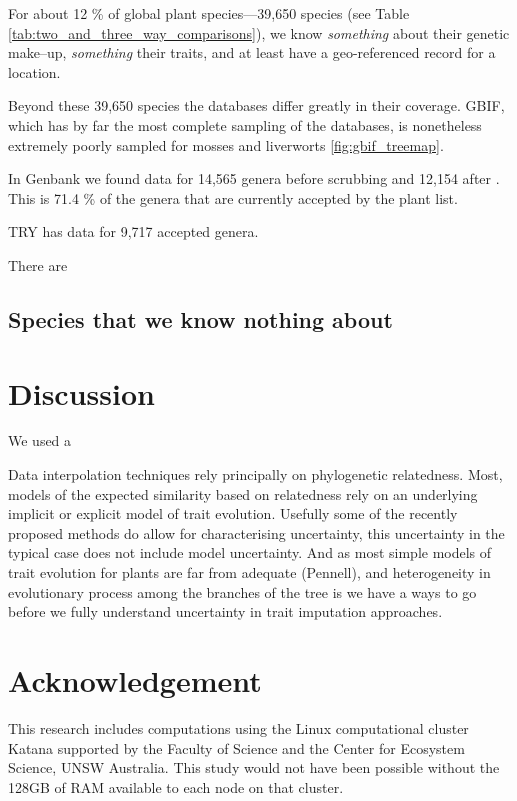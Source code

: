 \documentclass[a4paper,11pt]{article}
\begin{document}
For about 12 \% of global plant species---39,650 species (see Table \ref{tab:two_and_three_way_comparisons}), we know \emph{something} about their genetic make--up, \emph{something} their traits, and at least have a geo-referenced record for a location.  

Beyond these 39,650 species the databases differ greatly in their coverage.  GBIF, which has by far the most complete sampling of the databases, is nonetheless extremely poorly sampled for mosses and liverworts \ref{fig:gbif_treemap}.  

In Genbank we found data for 14,565 genera before scrubbing and 12,154 after \citep[see][for a detailed analysis of number of genes and phylogenetic distribution of the data]{hinchliff2014some}.  This is 71.4 \% of the genera that are currently accepted by the plant list.  

TRY has data for 9,717 accepted genera.  


There are 


\subsection{Species that we know nothing about}

\section{Discussion}

We used a 


Data interpolation techniques rely principally on phylogenetic relatedness.  
Most, models of the expected similarity based on relatedness rely on an underlying implicit or explicit model of trait evolution.  
Usefully some of the recently proposed methods do allow for characterising uncertainty, this uncertainty in the typical case
does not include model uncertainty.  And as most simple models of trait evolution for plants are far from adequate (Pennell), and heterogeneity in evolutionary 
process among the branches of the tree is 
we have a ways to go before we fully understand uncertainty in trait imputation approaches.   

\section{Acknowledgement}

This research includes computations using the Linux computational cluster Katana supported by the Faculty of Science and the Center for Ecosystem Science, UNSW Australia.
This study would not have been possible without the 128GB of RAM available to each node on that cluster.  
\end{document}
